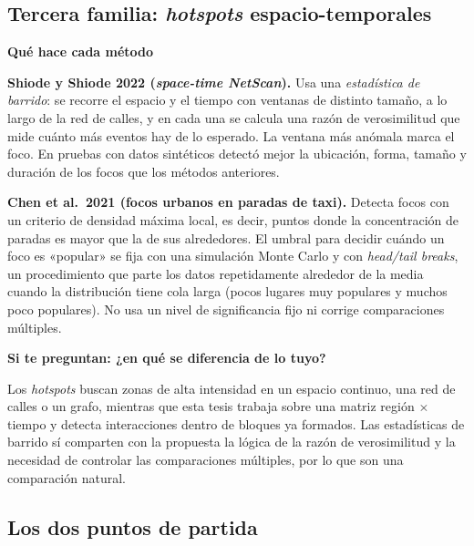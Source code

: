 \documentclass[11pt,a4paper]{article}
\newcommand{\cajainicio}[3]{\par\medskip\noindent
  \begin{lrbox}{\cajabox}\begin{minipage}{\dimexpr\linewidth-2\fboxsep-2\fboxrule\relax}%
  \textbf{\color{#1}#3}\par\smallskip}
\newcommand{\cajafin}[2]{\end{minipage}\end{lrbox}\fcolorbox{#1}{#2}{\usebox{\cajabox}}\par\medskip}
\newenvironment{nota}[1]{\cajainicio{acc}{acc!7}{#1}}{\cajafin{acc}{acc!7}}
\begin{document}
\subsection*{Tercera familia: \emph{hotspots} espacio-temporales}

\begin{nota}{Qué hace cada método}
\textbf{Shiode y Shiode 2022 (\emph{space-time NetScan}).} Usa una \emph{estadística de barrido}: se recorre el espacio y el tiempo con ventanas de distinto tamaño, a lo largo de la red de calles, y en cada una se calcula una razón de verosimilitud que mide cuánto más eventos hay de lo esperado. La ventana más anómala marca el foco. En pruebas con datos sintéticos detectó mejor la ubicación, forma, tamaño y duración de los focos que los métodos anteriores.

\textbf{Chen et al.\ 2021 (focos urbanos en paradas de taxi).} Detecta focos con un criterio de densidad máxima local, es decir, puntos donde la concentración de paradas es mayor que la de sus alrededores. El umbral para decidir cuándo un foco es «popular» se fija con una simulación Monte Carlo y con \emph{head/tail breaks}, un procedimiento que parte los datos repetidamente alrededor de la media cuando la distribución tiene cola larga (pocos lugares muy populares y muchos poco populares). No usa un nivel de significancia fijo ni corrige comparaciones múltiples.
\end{nota}

\begin{nota}{Si te preguntan: ¿en qué se diferencia de lo tuyo?}
Los \emph{hotspots} buscan zonas de alta intensidad en un espacio continuo, una red de calles o un grafo, mientras que esta tesis trabaja sobre una matriz región $\times$ tiempo y detecta interacciones dentro de bloques ya formados. Las estadísticas de barrido sí comparten con la propuesta la lógica de la razón de verosimilitud y la necesidad de controlar las comparaciones múltiples, por lo que son una comparación natural.
\end{nota}

\subsection*{Los dos puntos de partida}
\end{document}
